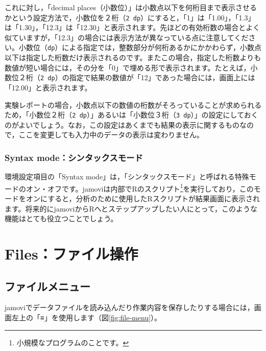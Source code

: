 \documentclass[
  12pt,
  a5jpaper,
  lualatex, ja=standard]{bxjsbook}
\begin{document}
これに対し，「decimal places（小数位）」は小数点以下を何桁目まで表示させるかという設定方法で，小数位を２桁（\texttt{2\ dp}）にすると，「1」は「1.00」，「1.3」は「1.30」，「12.3」は「12.30」と表示されます。先ほどの有効桁数の場合とよく似ていますが，「12.3」の場合には表示方法が異なっている点に注意してください。小数位（\texttt{dp}）による指定では，整数部分が何桁あるかにかかわらず，小数点以下は指定した桁数だけ表示されるのです。またこの場合，指定した桁数よりも数値が短い場合には，その分を「0」で埋める形で表示されます。たとえば，小数位２桁（\texttt{2\ dp}）の指定で結果の数値が「12」であった場合には，画面上には「12.00」と表示されます。

実験レポートの場合，小数点以下の数値の桁数がそろっていることが求められるため，「小数位２桁（\texttt{2\ dp}）」あるいは「小数位３桁（\texttt{3\ dp}）」の設定にしておくのがよいでしょう。なお，この設定はあくまでも結果の表示に関するものなので，ここを変更しても入力中のデータの表示は変わりません。

\hypertarget{syn}{%
\subsubsection*{Syntax mode：シンタックスモード}\label{syn}}

環境設定項目の「Syntax mode」は，「シンタックスモード」と呼ばれる特殊モードのオン・オフです。jamoviは内部でRのスクリプト\footnote{小規模なプログラムのことです。}を実行しており，このモードをオンにすると，分析のために使用したRスクリプトが結果画面に表示されます。将来的にjamoviからRへとステップアップしたい人にとって，このような機能はとても役立つことでしょう。

\hypertarget{sec:intro-file}{%
\section{Files：ファイル操作}\label{sec:intro-file}}

\hypertarget{subsec:intro-file-menu}{%
\subsection{ファイルメニュー}\label{subsec:intro-file-menu}}

jamoviでデータファイルを読み込んだり作業内容を保存したりする場合には，画面左上の「\textbf{≡}」を使用します（図\ref{fig:file-menu}）。
\end{document}
